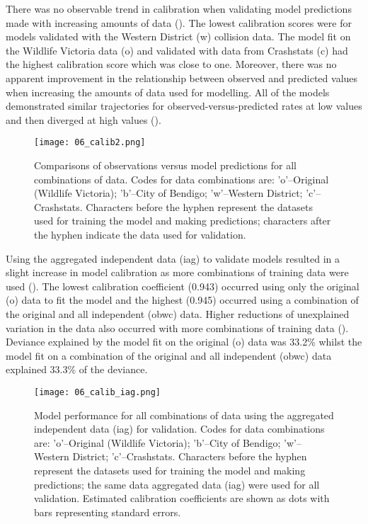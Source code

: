 There was no observable trend in calibration when validating model predictions made with increasing amounts of data (). The lowest calibration scores were for models validated with the Western District (w) collision data. The model fit on the Wildlife Victoria data (o) and validated with data from Crashstats (c) had the highest calibration score which was close to one. Moreover, there was no apparent improvement in the relationship between observed and predicted values when increasing the amounts of data used for modelling. All of the models demonstrated similar trajectories for observed-versus-predicted rates at low values and then diverged at high values ().

\begin{figure*}[!t]
  \centering
  \texttt{[image: 06\_calib2.png]}
  \caption[Comparisons of observations versus model predictions for all combinations of original and independent data]{Comparisons of observations versus model predictions for all combinations of data. Codes for data combinations are: 'o'--Original (Wildlife Victoria); 'b'--City of Bendigo; 'w'--Western District; 'c'--Crashstats. Characters before the hyphen represent the datasets used for training the model and making predictions; characters after the hyphen indicate the data used for validation.}
  \label{val_calib2}
\end{figure*}

Using the aggregated independent data (iag) to validate models resulted in a slight increase in model calibration as more combinations of training data were used ().  The lowest calibration coefficient (0.943) occurred using only the original (o) data to fit the model and the highest (0.945) occurred using a combination of the original and all independent (obwc) data. Higher reductions of unexplained variation in the data also occurred with more combinations of training data (). Deviance explained by the model fit on the original (o) data was 33.2\% whilst the model fit on a combination of the original and all independent (obwc) data explained 33.3\% of the deviance.

\begin{figure*}[!t]
  \centering
  \texttt{[image: 06\_calib\_iag.png]}
  \caption[Model calibration for all combinations of training data using the aggregated independent data for validation]{Model performance for all combinations of data using the aggregated independent data (iag) for validation. Codes for data combinations are: 'o'--Original (Wildlife Victoria); 'b'--City of Bendigo; 'w'--Western District; 'c'--Crashstats. Characters before the hyphen represent the datasets used for training the model and making predictions; the same data aggregated data (iag) were used for all validation. Estimated calibration coefficients are shown as dots with bars representing standard errors.}
  \label{val_calib_iag}
\end{figure*}

